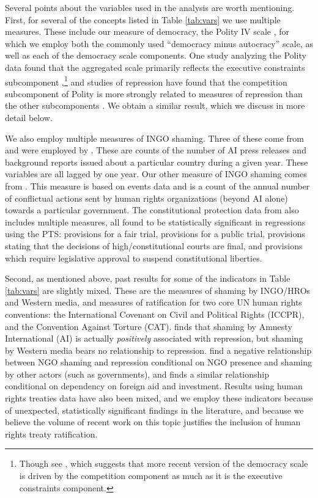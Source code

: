 \documentclass[11pt]{article}
\begin{document}
Several points about the variables used in the analysis are worth mentioning. First, for several of the concepts listed in Table \ref{tab:vars} we use multiple measures. These include our measure of democracy, the Polity IV scale \citep{MarshallJaggers2009}, for which we employ both the commonly used ``democracy minus autocracy'' scale, as well as each of the democracy scale components. One study analyzing the Polity data found that the aggregated scale primarily reflects the executive constraints subcomponent \citep{GleditschWard1997},\footnote{Though see \citet{hill2013concept}, which suggests that more recent version of the democracy scale is driven by the competition component as much as it is the executive constraints component.} and studies of repression have found that the competition subcomponent of Polity is more strongly related to measures of repression than the other subcomponents \citep{Keith2002PRQ, BDMetal2005}. We obtain a similar result, which we discuss in more detail below.  

We also employ multiple measures of INGO shaming. Three of these come from \citet{RonRamosRodgers2005} and were employed by \citet{HafnerBurton2008}. These are counts of the number of AI press releases and background reports issued about a particular country during a given year. These variables are all lagged by one year. Our other measure of INGO shaming comes from \citet{MurdieDavis2012}. This measure is based on events data and is a count of the annual number of conflictual actions sent by human rights organizations (beyond AI alone) towards a particular government. The constitutional protection data from \citet{KeithTatePoe2009} also includes multiple measures, all found to be statistically significant in regressions using the PTS: provisions for a fair trial, provisions for a public trial, provisions stating that the decisions of high/constitutional courts are final, and provisions which require legislative approval to suspend constitutional liberties. 

Second, as mentioned above, past results for some of the indicators in Table \ref{tab:vars} are slightly mixed. These are the measures of shaming by INGO/HROs and Western media, and measures of ratification for two core UN human rights conventions: the International Covenant on Civil and Political Rights (ICCPR), and the Convention Against Torture (CAT). \citet{HafnerBurton2008} finds that shaming by Amnesty International (AI) is actually {\it positively} associated with repression, but shaming by Western media bears no relationship to repression. \citet{MurdieDavis2012} find a negative relationship between NGO shaming and repression conditional on NGO presence and shaming by other actors (such as governments), and \citet{Franklin2008} finds a similar relationship conditional on dependency on foreign aid and investment. Results using human rights treaties data have also been mixed, and we employ these indicators because of unexpected, statistically significant findings in the literature, and because we believe the volume of recent work on this topic justifies the inclusion of human rights treaty ratification. 
\end{document}
